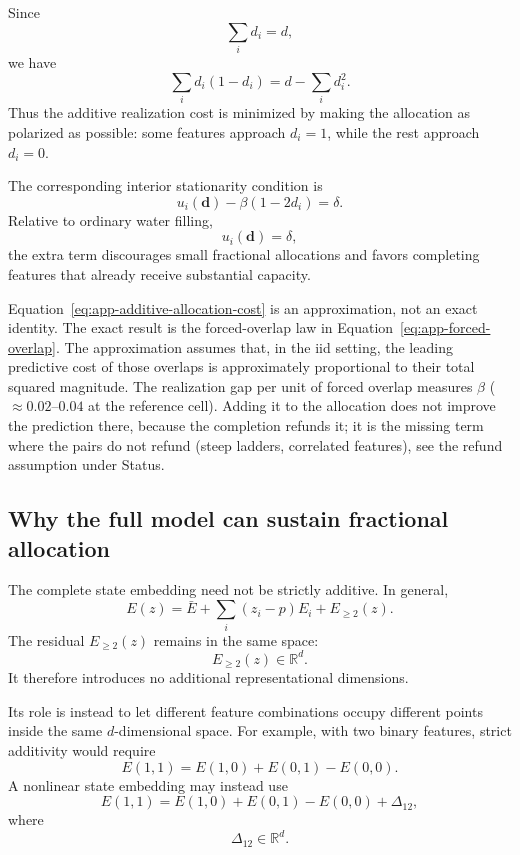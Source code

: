 Since
\[
\sum_i d_i=d,
\]
we have
\[
\sum_i d_i(1-d_i)
=
d-\sum_i d_i^2.
\]
Thus the additive realization cost is minimized by making the allocation as
polarized as possible: some features approach \(d_i=1\), while the rest approach
\(d_i=0\).

The corresponding interior stationarity condition is
\begin{equation}
\boxed{
u_i(\mathbf d)
-
\beta(1-2d_i)
=
\delta.
}
\label{eq:app-additive-kkt}
\end{equation}
Relative to ordinary water filling,
\[
u_i(\mathbf d)=\delta,
\]
the extra term discourages small fractional allocations and favors completing
features that already receive substantial capacity.

Equation~\eqref{eq:app-additive-allocation-cost} is an approximation, not an exact
identity. The exact result is the forced-overlap law in
Equation~\eqref{eq:app-forced-overlap}. The approximation assumes that, in the iid
setting, the leading predictive cost of those overlaps is approximately proportional
to their total squared magnitude. The realization gap per unit of forced overlap measures \(\beta\)
(\(\approx0.02\)--\(0.04\) at the reference cell). Adding it to the allocation does
not improve the prediction there, because the completion refunds it; it is the
missing term where the pairs do not refund (steep ladders, correlated features), see
the refund assumption under Status.

\subsection{Why the full model can sustain fractional allocation}

The complete state embedding need not be strictly additive. In general,
\begin{equation}
E(z)
=
\bar E
+
\sum_i(z_i-p)E_i
+
E_{\ge2}(z).
\label{eq:app-full-representation}
\end{equation}
The residual \(E_{\ge2}(z)\) remains in the same space:
\[
E_{\ge2}(z)\in\mathbb R^d.
\]
It therefore introduces no additional representational dimensions.

Its role is instead to let different feature combinations occupy different points
inside the same \(d\)-dimensional space. For example, with two binary features,
strict additivity would require
\[
E(1,1)
=
E(1,0)+E(0,1)-E(0,0).
\]
A nonlinear state embedding may instead use
\[
E(1,1)
=
E(1,0)+E(0,1)-E(0,0)
+
\Delta_{12},
\]
where
\[
\Delta_{12}\in\mathbb R^d.
\]


